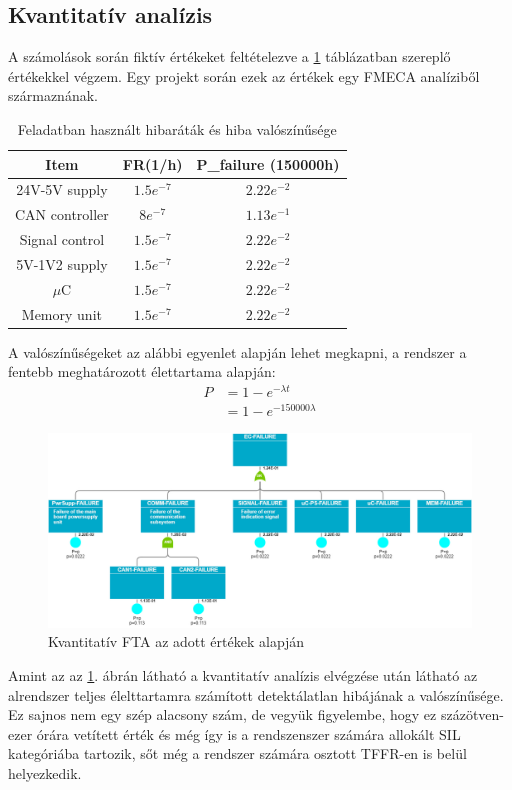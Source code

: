 \subsection{Kvantitatív analízis}
A számolások során fiktív értékeket feltételezve a \ref{tab:fmeca} táblázatban szereplő értékekkel végzem.
Egy projekt során ezek az értékek egy FMECA analíziből származnának.

\begin{table}
    \footnotesize
    \centering
    \begin{tabular}{ |c|c|c| }
        \hline
        Item & FR(1/h) & P\_failure (150000h)\\
        \hline
        24V-5V supply & $1.5e^{-7}$&$2.22e^{-2}$ \\
        \hline
        CAN controller & $8e^{-7}$&$1.13e^{-1}$ \\
        \hline
        Signal control & $1.5e^{-7}$&$2.22e^{-2}$ \\
        \hline
        5V-1V2 supply & $1.5e^{-7}$&$2.22e^{-2}$ \\
        \hline
        $\mu$C & $1.5e^{-7}$&$2.22e^{-2}$ \\
        \hline
        Memory unit & $1.5e^{-7}$&$2.22e^{-2}$ \\ 
        \hline
    \end{tabular}
    \caption{Feladatban használt hibaráták és hiba valószínűsége}
    \label{tab:fmeca}
\end{table}

A valószínűségeket az alábbi egyenlet alapján lehet megkapni, a rendszer a fentebb meghatározott élettartama alapján: 
\begin{align}
    P&=1-e^{-\lambda t} \\
    &=1-e^{-150000\lambda}
\end{align}

\begin{figure}
    \footnotesize
    \centering
    \includegraphics[width=150mm, keepaspectratio]{figures/QuantiFTA.png}
    \caption{Kvantitatív FTA az adott értékek alapján}
    \label{fig:quant}
\end{figure}

Amint az az \ref{fig:quant}. ábrán látható a kvantitatív analízis elvégzése után látható az alrendszer teljes élelttartamra számított detektálatlan hibájának a valószínűsége.
Ez sajnos nem egy szép alacsony szám, de vegyük figyelembe, hogy ez százötven-ezer órára vetített érték és még így is a rendszenszer számára allokált SIL kategóriába tartozik, sőt még a rendszer számára osztott TFFR-en is belül helyezkedik.
